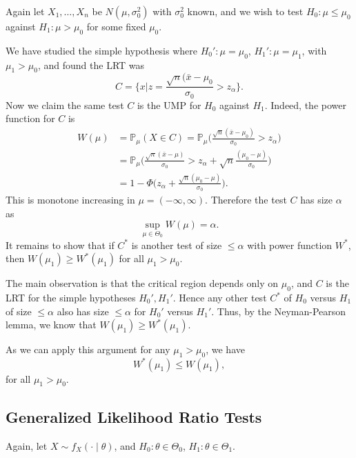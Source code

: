 \documentclass[12pt]{article}
\begin{document}
\begin{exbox}
	Again let $X_1, \ldots, X_n$ be $N(\mu, \sigma_0^2)$ with $\sigma_0^2$ known, and we wish to test $H_0 : \mu \leq \mu_0$ against $H_1 : \mu > \mu_0$ for some fixed $\mu_0$.

	We have studied the simple hypothesis where $H_0' : \mu = \mu_0$, $H_1': \mu = \mu_1$, with $\mu_1 > \mu_0$, and found the LRT was
	\[
		C = \biggl\{ x \big| z = \frac{\sqrt n (\bar x - \mu_0}{\sigma_0} > z_{\alpha} \biggr\}
	.\]
	Now we claim the same test $C$ is the UMP for $H_0$ against $H_1$. Indeed, the power function for $C$ is 
	\begin{align*}
		W(\mu) &= \mathbb{P}_\mu(X \in C) = \mathbb{P}_\mu \biggl( \frac{\sqrt n (\bar x - \mu_0)}{\sigma_0} > z_{\alpha} \biggr) \\
		       &= \mathbb{P}_\mu \biggl( \frac{\sqrt n(\bar x - \mu)}{\sigma_0} > z_\alpha + \sqrt{n} \frac{(\mu_0 - \mu)}{\sigma_0} \biggr) \\
		       &= 1 - \Phi \biggl( z_{\alpha} + \frac{\sqrt n(\mu_0 - \mu)}{\sigma_0} \biggr).
	\end{align*}
	This is monotone increasing in $\mu = (-\infty, \infty)$. Therefore the test $C$ has size $\alpha$ as
	\[
	\sup_{\mu \in \Theta_0} W(\mu) = \alpha
	.\]
	It remains to show that if $C^{\ast}$ is another test of size $\leq \alpha$ with power function $W^{\ast}$, then $W(\mu_1) \geq W^{\ast}(\mu_1)$ for all $\mu_1 > \mu_0$.

	The main observation is that the critical region depends only on $\mu_0$, and $C$ is the LRT for the simple hypotheses $H_0', H_1'$. Hence any other test $C^{\ast}$ of $H_0$ versus $H_1$ of size $\leq \alpha$ also has size $\leq \alpha$ for $H_0'$ versus $H_1'$. Thus, by the Neyman-Pearson lemma, we know that $W(\mu_1) \geq W^{\ast}(\mu_1)$.

	As we can apply this argument for any $\mu_1 > \mu_0$, we have
	\[
	W^{\ast}(\mu_1) \leq W(\mu_1)
	,\]
	for all $\mu_1 > \mu_0$.
\end{exbox}

\subsection{Generalized Likelihood Ratio Tests}
\label{sub:generalized_likelihood_ratio_tests}

Again, let $X \sim f_X(\cdot \mid \theta)$, and $H_0 : \theta \in \Theta_0$, $H_1 : \theta \in \Theta_1$.
\end{document}
